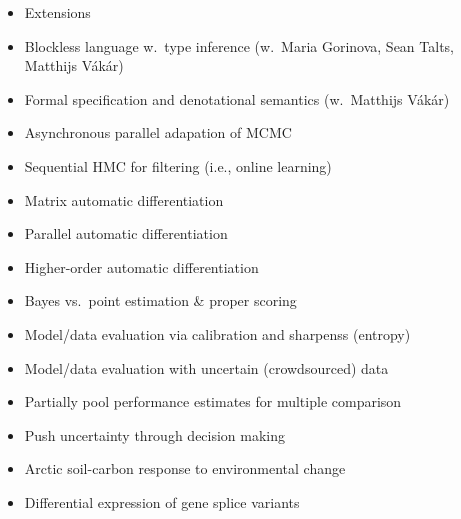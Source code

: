 \documentclass[10pt]{report}
\begin{document}

\begin{itemize}
\item Extensions
\item Blockless language w.\ type inference (w.\ Maria Gorinova, Sean Talts, Matthijs V\'ak\'ar)
\item Formal specification and denotational semantics (w.\ Matthijs V\'ak\'ar)
\end{itemize}

\begin{itemize}
\item Asynchronous parallel adapation of MCMC
\item Sequential HMC for filtering (i.e., online learning)
\item Matrix automatic differentiation
\item Parallel automatic differentiation
\item Higher-order automatic differentiation
\end{itemize}

\begin{itemize}
\item Bayes vs.\ point estimation \& proper scoring
\item Model/data evaluation via calibration and sharpenss (entropy)
\item Model/data evaluation with uncertain (crowdsourced) data
\item Partially pool performance estimates for multiple comparison
\item Push uncertainty through decision making
\end{itemize}

\begin{itemize}
\item Arctic soil-carbon response to environmental change
\item Differential expression of gene splice variants
\end{itemize}
\end{document}
